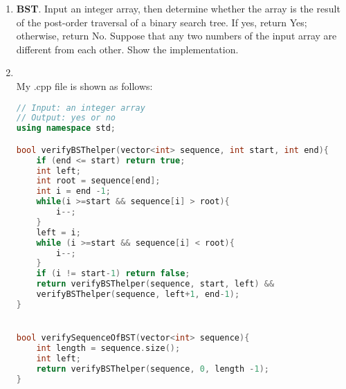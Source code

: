 \documentclass[12pt,a4paper]{article}
\makeatletter
\newtheorem*{solution}{Solution}
\theoremstyle{definition}
\renewenvironment{solution}[1][Solution] {\par\pushQED{\qed}\normalfont\topsep6\p@\@plus6\p@\relax\trivlist\item[\hskip\labelsep\bfseries#1\@addpunct{.}]\ignorespaces}{\popQED\endtrivlist\@endpefalse} \makeatother
\makeatother
\begin{document}
\begin{enumerate}
\newpage

\item  \textbf{BST}. Input an integer array, then determine whether the array is the result of the post-order traversal of a binary search tree. If yes, return Yes; otherwise, return No. Suppose that any two numbers of the input array are different from each other. Show the implementation.
\begin{solution}
	\hspace*{\fill}\\
	My .cpp file is shown as follows:
\begin{lstlisting}[language=C++]
// Input: an integer array
// Output: yes or no
using namespace std;

bool verifyBSThelper(vector<int> sequence, int start, int end){
	if (end <= start) return true;
	int left;
	int root = sequence[end];
	int i = end -1;
	while(i >=start && sequence[i] > root){
		i--;
	}
	left = i;
	while (i >=start && sequence[i] < root){
		i--;
	}
	if (i != start-1) return false;
	return verifyBSThelper(sequence, start, left) && 
	verifyBSThelper(sequence, left+1, end-1);
}


bool verifySequenceOfBST(vector<int> sequence){
	int length = sequence.size();
	int left;
	return verifyBSThelper(sequence, 0, length -1);
}
\end{lstlisting}
\end{solution}

\end{enumerate}

\end{document}
